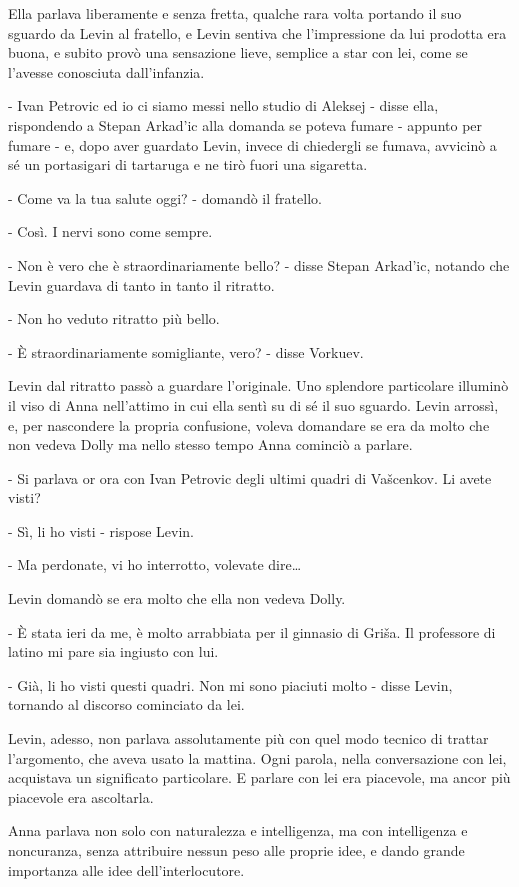 Ella parlava liberamente e senza fretta, qualche rara volta portando il suo sguardo da Levin al fratello, e Levin sentiva che l'impressione da lui prodotta era buona, e subito provò una sensazione lieve, semplice a star con lei, come se l'avesse conosciuta dall'infanzia. 

- Ivan Petrovic ed io ci siamo messi nello studio di Aleksej - disse ella, rispondendo a Stepan Arkad'ic alla domanda se poteva fumare - appunto per fumare - e, dopo aver guardato Levin, invece di chiedergli se fumava, avvicinò a sé un portasigari di tartaruga e ne tirò fuori una sigaretta. 

- Come va la tua salute oggi? - domandò il fratello. 

- Così. I nervi sono come sempre. 

- Non è vero che è straordinariamente bello? - disse Stepan Arkad'ic, notando che Levin guardava di tanto in tanto il ritratto. 

- Non ho veduto ritratto più bello. 

- È straordinariamente somigliante, vero? - disse Vorkuev. 

Levin dal ritratto passò a guardare l'originale. Uno splendore particolare illuminò il viso di Anna nell'attimo in cui ella sentì su di sé il suo sguardo. Levin arrossì, e, per nascondere la propria confusione, voleva domandare se era da molto che non vedeva Dolly ma nello stesso tempo Anna cominciò a parlare. 

- Si parlava or ora con Ivan Petrovic degli ultimi quadri di Vašcenkov. Li avete visti? 

- Sì, li ho visti - rispose Levin. 

- Ma perdonate, vi ho interrotto, volevate dire\ldots{} 

Levin domandò se era molto che ella non vedeva Dolly. 

- È stata ieri da me, è molto arrabbiata per il ginnasio di Griša. Il professore di latino mi pare sia ingiusto con lui. 

- Già, li ho visti questi quadri. Non mi sono piaciuti molto - disse Levin, tornando al discorso cominciato da lei. 

Levin, adesso, non parlava assolutamente più con quel modo tecnico di trattar l'argomento, che aveva usato la mattina. Ogni parola, nella conversazione con lei, acquistava un significato particolare. E parlare con lei era piacevole, ma ancor più piacevole era ascoltarla. 

Anna parlava non solo con naturalezza e intelligenza, ma con intelligenza e noncuranza, senza attribuire nessun peso alle proprie idee, e dando grande importanza alle idee dell'interlocutore. 

